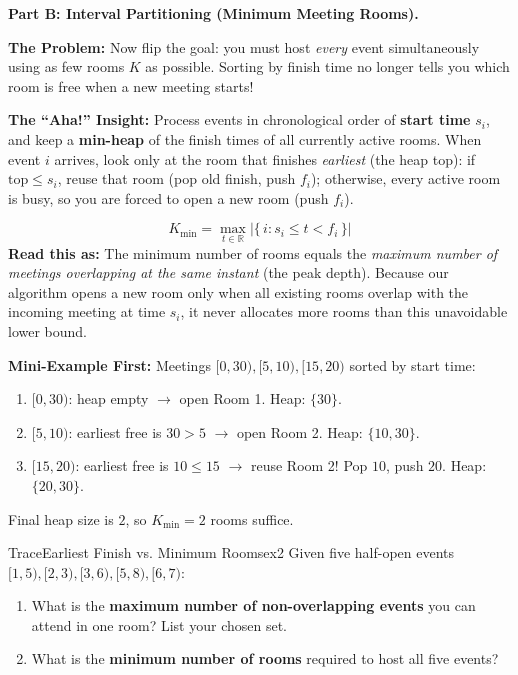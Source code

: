 \documentclass[11pt,a4paper]{article}
\theoremstyle{definition}
\newcommand{\painbeat}{\textbf{\color{accentamber}The Problem:} }
\newcommand{\ahabeat}{\textbf{\color{accentteal}The ``Aha!'' Insight:} }
\newcommand{\examplebeat}{\textbf{\color{primaryblue}Mini-Example First:} }
\begin{document}
\textbf{Part B: Interval Partitioning (Minimum Meeting Rooms).}

\painbeat Now flip the goal: you must host \emph{every} event simultaneously using as few rooms $K$ as possible. Sorting by finish time no longer tells you which room is free when a new meeting starts!

\ahabeat Process events in chronological order of \textbf{start time} $s_i$, and keep a \textbf{min-heap} of the finish times of all currently active rooms. When event $i$ arrives, look only at the room that finishes \emph{earliest} (the heap top): if $\text{top} \le s_i$, reuse that room (pop old finish, push $f_i$); otherwise, every active room is busy, so you are forced to open a new room (push $f_i$).

\begin{formulabox}
$$K_{\min} = \max_{t \in \mathbb{R}} \big|\{\, i : s_i \le t < f_i \,\}\big|$$
\textbf{Read this as:} The minimum number of rooms equals the \emph{maximum number of meetings overlapping at the same instant} (the peak depth). Because our algorithm opens a new room only when all existing rooms overlap with the incoming meeting at time $s_i$, it never allocates more rooms than this unavoidable lower bound.
\end{formulabox}

\examplebeat Meetings $[0, 30), [5, 10), [15, 20)$ sorted by start time:
\begin{enumerate}[itemsep=2pt, topsep=2pt]
    \item $[0, 30)$: heap empty $\to$ open Room 1. Heap: $\{30\}$.
    \item $[5, 10)$: earliest free is $30 > 5$ $\to$ open Room 2. Heap: $\{10, 30\}$.
    \item $[15, 20)$: earliest free is $10 \le 15$ $\to$ reuse Room 2! Pop $10$, push $20$. Heap: $\{20, 30\}$.
\end{enumerate}
Final heap size is $2$, so $K_{\min} = 2$ rooms suffice.

\begin{tryitbox}{Trace}{Earliest Finish vs. Minimum Rooms}{ex2}
Given five half-open events $[1, 5), [2, 3), [3, 6), [5, 8), [6, 7)$:
\begin{enumerate}[itemsep=1pt, topsep=2pt]
    \item What is the \textbf{maximum number of non-overlapping events} you can attend in one room? List your chosen set.
    \item What is the \textbf{minimum number of rooms} required to host all five events?
\end{enumerate}
\end{tryitbox}
\end{document}
